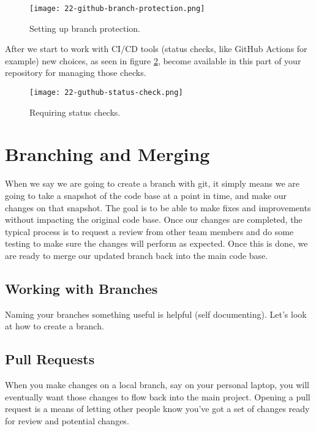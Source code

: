 \begin{figure}[!htb]
\centering
\texttt{[image: 22-github-branch-protection.png]}
\caption{Setting up branch protection.}
\label{branchprotect}
\end{figure}

\justifying
After we start to work with CI/CD tools (status checks, like GitHub Actions for example) new choices, as seen in figure \ref{statuscheck}, become
available in this part of your repository for managing those checks.

\begin{figure}
\centering
\texttt{[image: 22-guthub-status-check.png]}
\caption{Requiring status checks.}
\label{statuscheck}
\end{figure}

\section{Branching and Merging}

When we say we are going to create a branch with git, it simply means we are going to take a snapshot of the code base at a point in time, and make our changes on that snapshot. The goal is to be able to make fixes and improvements without impacting the original code base.
Once our changes are completed, the typical process is to request a review from other team members and do some testing to make sure the changes will perform as expected. Once this is done, we are ready to merge our updated branch back into the main code base.

\subsection{Working with Branches}

\justifying
Naming your branches something useful is helpful (self documenting). Let's look at how to create a branch.

\subsection{Pull Requests}

\justifying
When you make changes on a local branch, say on your personal laptop, you will eventually want those changes
to flow back into the main project. Opening a pull request is a means of letting other
people know you've got a set of changes ready for review and potential changes.


